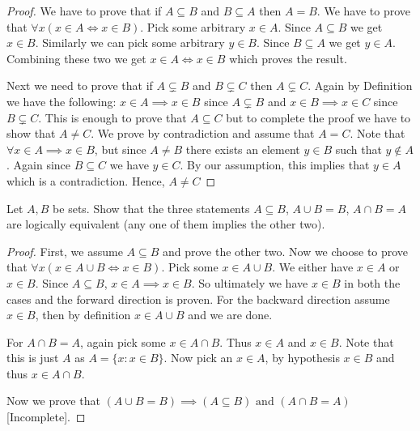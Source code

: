 \documentclass[12pt]{article}
\theoremstyle{remark}
\newcommand{\exercise}[1]{\noindent {\bf Exercise #1.}}
\newenvironment{ques}[1][]{%
	\begin{mdframed}[style=mdblackbox]
		\exercise{#1}
}{%
\end{mdframed}
}
\begin{document}
\begin{proof}
    We have to prove that if $ A \subseteq B $ and $ B \subseteq A $ then $ A = B $. We have to prove that $ \forall x (x \in A \iff x \in B ) $. Pick some arbitrary $ x \in A $. Since $ A \subseteq B $ we get $ x \in B $. Similarly we can pick some arbitrary $ y \in B $. Since $ B \subseteq A $ we get $ y \in A $. Combining these two we get $ x \in A \iff x \in B $ which proves the result.\par
    Next we need to prove that if $ A \subsetneq B $ and $ B \subsetneq C $ then $ A \subsetneq C $. Again by Definition we have the following: $ x \in A \implies x \in B $ since $ A \subsetneq B $ and $ x \in B \implies x \in C $ since $ B \subsetneq C $. This is enough to prove that $ A \subseteq C $ but to complete the proof we have to show that $ A \neq C $. 
    We prove by contradiction and assume that $ A = C $. Note that $ \forall x \in A \implies x \in B $, but since $ A \neq B $ there exists an element $ y \in B $ such that $ y \notin A $. Again since $ B \subseteq C $ we have $ y \in C $. By our assumption, this implies that $ y \in A $ which is a contradiction. Hence, $ A \neq C $
\end{proof}

\begin{ques}[3.1.5]
    Let $ A, B $ be sets. Show that the three statements $ A \subseteq B $, $ A \cup B = B $, $ A \cap B = A $ are logically equivalent (any one of them implies the other two).
\end{ques}

\begin{proof}
   First, we assume $ A \subseteq B $ and prove the other two. Now we choose to prove that $ \forall x (x \in A \cup B \iff x \in B) $. Pick some $ x \in A \cup B $. We either have $ x \in A $ or $ x \in B $. Since $ A \subseteq B $, $ x \in A \implies x \in B $. So ultimately we have $ x \in B $ in both the cases and the forward direction is proven. For the backward direction assume $ x \in B $, then by definition $ x \in A \cup B $ and we are done. \par
   For $ A \cap B = A $, again pick some $ x \in A \cap B $. Thus $ x \in A $ and $ x \in B $. Note that this is just $ A $ as $ A = \{ x : x \in B \} $. Now pick an $ x \in A $, by hypothesis $ x \in B $ and thus $ x \in A \cap B $. \par 
   Now we prove that $ (A \cup B = B) \implies (A \subseteq B) \text{ and } (A \cap B = A) $ [Incomplete].    
\end{proof}
\end{document}
